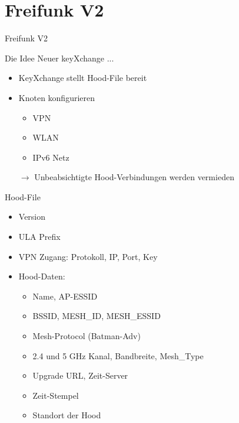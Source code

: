 \section{Freifunk V2}

\begin{frame}{}
    \begin{center}
        Freifunk V2
     \end{center}
\end{frame}

\begin{frame}{Die Idee}
    Neuer keyXchange ...

    \begin{itemize}
        \item KeyXchange stellt Hood-File bereit
        \item Knoten konfigurieren
        \begin{itemize}
            \item VPN
            \item WLAN
            \item IPv6 Netz
        \end{itemize}
        \item[$\rightarrow$] Unbeabsichtigte Hood-Verbindungen werden vermieden
    \end{itemize}
\end{frame}

\begin{frame}{Hood-File}
    \begin{itemize}
        \item Version
        \item ULA Prefix
        \item VPN Zugang: Protokoll, IP, Port, Key
        \item Hood-Daten: 
        \begin{itemize}
            \item Name, AP-ESSID
            \item BSSID, MESH\_ID, MESH\_ESSID
            \item Mesh-Protocol (Batman-Adv)
            \item 2.4 und 5 GHz Kanal, Bandbreite, Mesh\_Type
            \item Upgrade URL, Zeit-Server
            \item Zeit-Stempel
            \item Standort der Hood
        \end{itemize}
    \end{itemize}
\end{frame}

